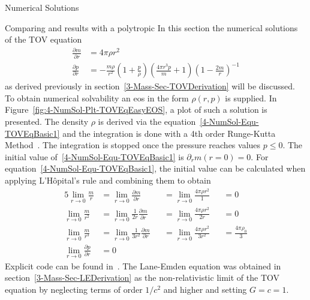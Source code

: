 \begin{section}{Numerical Solutions}
\begin{subsection}{Comparing \texorpdfstring{}{TOV} and \texorpdfstring{}{LE} results with a polytropic \texorpdfstring{}{EoS}}
\label{4-NumSol-Sec-Comp-TOV-LE}
In this section the numerical solutions of the \ac{TOV} equation
\begin{align}
	\frac{\partial m}{\partial r} &= 4\pi\rho r^2\label{4-NumSol-Equ-TOVEqBasic1}\\
	\frac{\partial p}{\partial r} &=-\frac{m\rho}{r^2}\left(1+\frac{p}{\rho}\right)\left(\frac{4\pi r^3 p}{m}+1\right)\left(1-\frac{2m}{r}\right)^{-1}
	\label{4-NumSol-Equ-TOVEqBasic2}
\end{align}
as derived previously in section~\ref{3-Mass-Sec-TOVDerivation} will be discussed.
To obtain numerical solvability an \ac{eos} in the form $\rho(r,p)$ is supplied.
In Figure~\ref{fig:4-NumSol-Plt-TOVEqEasyEOS}, a plot of such a solution is presented.
The density $\rho$ is derived via the equation~\eqref{4-NumSol-Equ-TOVEqBasic1} and the integration is done with a 4th order Runge-Kutta Method~\cite{rungeUeberNumerischeAufloesung1895, schlömilch1901zeitschrift, h.SimplifiedDerivationAnalysis2010}.
The integration is stopped once the pressure reaches values $p\leq0$.
The initial value of~\eqref{4-NumSol-Equ-TOVEqBasic1} is $\partial_r m(r=0)=0$.
For equation~\eqref{4-NumSol-Equ-TOVEqBasic1}, the initial value can be calculated when applying L'Hôpital's rule and combining them to obtain
\begin{alignat}{5}
	\lim\limits_{r\rightarrow0}\frac{m}{r} &= \lim\limits_{r\rightarrow0}\frac{\partial m}{\partial r} &&=\lim\limits_{r\rightarrow0}\frac{4\pi\rho r^2}{1} &&= 0\\
	\lim\limits_{r\rightarrow0}\frac{m}{r^2} &= \lim\limits_{r\rightarrow0}\frac{1}{2r}\frac{\partial m}{\partial r}  &&= \lim\limits_{r\rightarrow0}\frac{4\pi\rho r^2}{2r} &&= 0\\
	\lim\limits_{r\rightarrow0}\frac{m}{r^3} &= \lim\limits_{r\rightarrow0}\frac{1}{3r^2}\frac{\partial m}{\partial r} &&=\lim\limits_{r\rightarrow0}\frac{4\pi\rho r^2}{3r^2} &&= \frac{4\pi\rho_0}{3}\\
	\lim\limits_{r\rightarrow0}\frac{\partial p}{\partial r} &= 0
\end{alignat}
Explicit code can be found in~\cite{pleyerGithubRepositoryJonas2021}.
The Lane-Emden equation was obtained in section~\ref{3-Mass-Sec-LEDerivation} as the non-relativistic limit of the \ac{TOV} equation by neglecting terms of order $1/c^2$ and higher and setting $G=c=1$.

\end{subsection}
\end{section}
